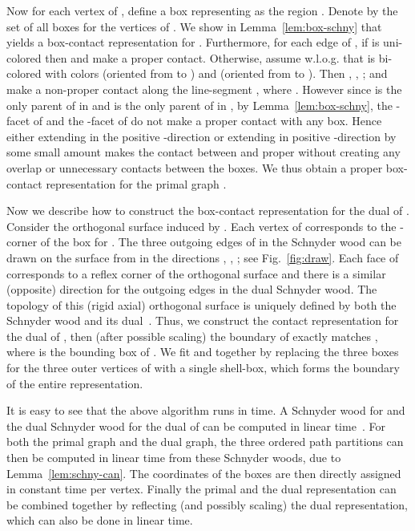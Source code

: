 \documentclass{article}
\newcommand{\WLOG}{w.l.o.g.\xspace}
\begin{document}
Now for each vertex  of , define a box  representing  as the region
 .
Denote by  the set of all boxes  for the vertices  of . We show in
Lemma~\ref{lem:box-schny} that  yields a box-contact representation for .
Furthermore, for each edge  of , if  is uni-colored then  and 
make a proper contact. Otherwise, assume \WLOG that  is bi-colored
with colors  (oriented from  to ) and  (oriented from  to ).
Then , , ;   and 
make a non-proper contact along the line-segment ,
where . However since  is the only parent of  in 
and  is the only parent of  in , by Lemma~\ref{lem:box-schny},
the -facet of  and the -facet of  do not make a proper contact with any box.
Hence either extending  in the positive -direction or extending  in positive -direction
by some small amount  makes the contact between  and  proper
without creating any overlap or unnecessary contacts between the boxes.
 We thus obtain a proper box-contact representation  for the primal graph .


Now we describe how to construct the box-contact representation for the dual of .
Consider the orthogonal surface induced by . Each vertex  of  corresponds
 to the -corner  of the box for . The three outgoing edges of  in the Schnyder
 wood can be drawn on the surface from  in the directions , , ; see Fig.~\ref{fig:draw}.
Each face of  corresponds to a reflex corner of the orthogonal surface and there is a similar
 (opposite) direction for the outgoing edges in the dual Schnyder wood. The topology of this
 (rigid axial) orthogonal
 surface is uniquely defined by both the Schnyder wood and its dual~\cite{FZ08}.
Thus, we construct the contact representation  for the dual of , then (after possible scaling)
 the boundary of  exactly matches , where  is the bounding box of .
We fit  and  together by replacing the three boxes for the three outer vertices of  with a single shell-box, which forms the boundary of the entire representation.

It is easy to see that the above algorithm runs in  time. A Schnyder wood for  and the dual Schnyder wood
 for the dual of  can be computed in linear time~\cite{FZ08}. For both the primal graph and the dual
 graph, the three ordered path partitions can then be computed in linear time from these Schnyder woods,
 due to Lemma~\ref{lem:schny-can}. The coordinates of the boxes are then directly assigned in constant
 time per vertex. Finally the primal and the dual representation can be combined together by reflecting
 (and possibly scaling) the dual representation, which can also be done in linear time.
\end{document}
